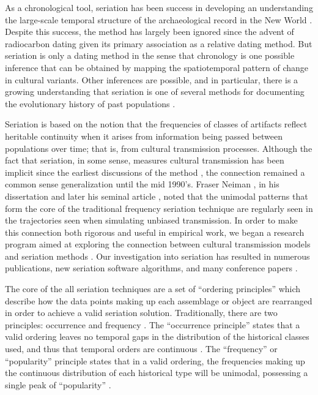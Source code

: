 As a chronological tool, seriation has been success in developing an
understanding the large-scale temporal structure of the archaeological
record in the New World
\citep{Beals1945, Bluhm1951, Evans1955, Ford1949, Kidder1917, Mayer-Oakes1955, Meggers1957, PFG1951, Rouse1939, Smith1950}.
Despite this success, the method has largely been ignored since the
advent of radiocarbon dating given its primary association as a relative
dating method. But seriation is only a dating method in the sense that
chronology is one possible inference that can be obtained by mapping the
spatiotemporal pattern of change in cultural variants. Other inferences
are possible, and in particular, there is a growing understanding that
seriation is one of several methods for documenting the evolutionary history of
past populations
\citep{Lipo1997,Lipo2001neutrality, Lipo2001,Lipo2001a,Lipo2005,lipomadsen1997,Lipo2015,Neiman1995,OBrien1999b,Teltser1995}.

Seriation is based on the notion that the frequencies of classes of
artifacts reflect heritable continuity when it arises from information
being passed between populations over time; that is, from cultural
transmission processes. Although the fact that seriation, in some sense,
measures cultural transmission has been implicit since the earliest
discussions of the method \citep[e.g.,][]{Kroeber1923}, the connection
remained a common sense generalization until the mid 1990's. Fraser
Neiman \citeyearpar{Neiman1990}, in his dissertation and later his seminal
  article \citep{Neiman1995}, noted that the unimodal patterns that
form the core of the traditional frequency seriation technique are
regularly seen in the trajectories seen when simulating unbiased
transmission. In order to make this connection both rigorous and useful
in empirical work, we began a research program aimed at exploring the
connection between cultural transmission models and seriation methods
\citep{Lipo1997}. Our investigation into seriation has
resulted in numerous publications, new seriation software algorithms,
and many conference papers
\citep{Lipo2008, Lipo2001neutrality, Lipo2001a, Lipo2005, lipomadsen1997, Lipo2015, Madsen2014, madsenlipo2015b, Madsen2008, o2015design}.

The core of the all seriation techniques are a set of ``ordering
principles'' which describe how the data points making up each
assemblage or object are rearranged in order to achieve a valid
seriation solution. Traditionally, there are two principles: occurrence
and frequency \citep{Dunnell1970, Rouse1967, Whitlam:1981vs}. The
``occurrence principle'' states that a valid ordering leaves no temporal
gaps in the distribution of the historical classes used, and thus that
temporal orders are continuous
\citep{dempsey1963statistical, rowe1959archaeological}. The
``frequency'' or ``popularity'' principle states that in a valid
ordering, the frequencies making up the continuous distribution of each
historical type will be unimodal, possessing a single peak of
``popularity'' \citep{Nelson1916}.

